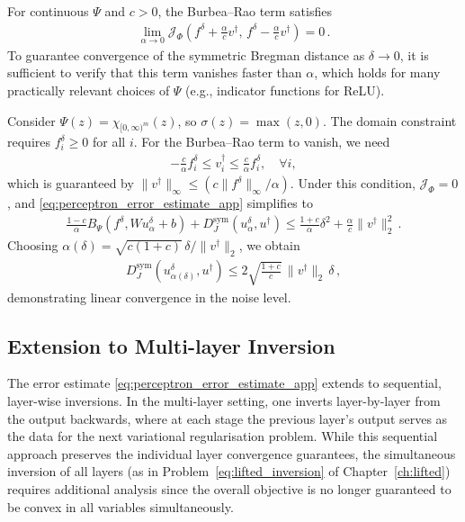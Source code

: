 \begin{rem}
For continuous $\Psi$ and $c > 0$, the Burbea--Rao term satisfies
\begin{align*}
    \lim_{\alpha \rightarrow 0} \mathcal{J}_{\Phi}\!\left(f^\delta+\frac{\alpha}{c}v^\dagger,\,f^\delta-\frac{\alpha}{c}v^\dagger\right) = 0 \, .
\end{align*}
To guarantee convergence of the symmetric Bregman distance as $\delta \to 0$, it is sufficient to verify that this term vanishes faster than $\alpha$, which holds for many practically relevant choices of $\Psi$ (e.g., indicator functions for ReLU).
\end{rem}

\begin{exm}\normalfont
Consider $\Psi(z) = \chi_{[0,\infty)^m}(z)$, so $\sigma(z) = \max(z,0)$. The domain constraint requires $f^\delta_i \geq 0$ for all $i$. For the Burbea--Rao term to vanish, we need
\begin{align*}
    -\frac{c}{\alpha} f^\delta_i \leq v^\dagger_i \leq \frac{c}{\alpha} f^\delta_i, \quad \forall i,
\end{align*}
which is guaranteed by $\|v^\dagger\|_\infty \le (c \|f^\delta\|_\infty / \alpha)$. Under this condition, $\mathcal{J}_{\Phi} = 0$, and \eqref{eq:perceptron_error_estimate_app} simplifies to
\begin{align*}
    \frac{1-c}{\alpha}B_\Psi(f^\delta, Wu_\alpha^\delta+b) + D_J^{\mathrm{sym}}(u_\alpha^\delta,u^\dagger) \le \frac{1+c}{\alpha}\delta^2 + \frac{\alpha}{c}\|v^\dagger\|_2^2 \, .
\end{align*}
Choosing $\alpha(\delta) = \sqrt{c(1+c)}\,\delta/\|v^\dagger\|_2$, we obtain
\begin{align*}
    D_J^{\mathrm{sym}}\!\left(u_{\alpha(\delta)}^\delta,u^\dagger\right) \le 2\sqrt{\frac{1+c}{c}}\,\|v^\dagger\|_2\,\delta \, ,
\end{align*}
demonstrating linear convergence in the noise level.
\end{exm}

\subsection{Extension to Multi-layer Inversion}

The error estimate \eqref{eq:perceptron_error_estimate_app} extends to sequential, layer-wise inversions. In the multi-layer setting, one inverts layer-by-layer from the output backwards, where at each stage the previous layer's output serves as the data for the next variational regularisation problem. While this sequential approach preserves the individual layer convergence guarantees, the simultaneous inversion of all layers (as in Problem~\eqref{eq:lifted_inversion} of Chapter~\ref{ch:lifted}) requires additional analysis since the overall objective is no longer guaranteed to be convex in all variables simultaneously.

